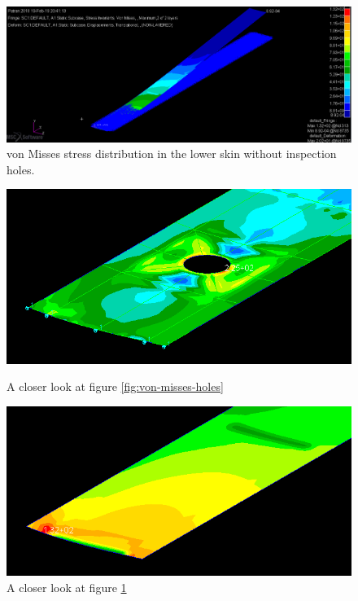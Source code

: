 \documentclass[11pt,a4paper,oneside]{memoir}
\begin{document}
\begin{enumerate}
    \begin{figure}[h]
        \centering
        \includegraphics[width = .8\textwidth]{figures/one-LWR-skin-von-misses.png}
        \caption{von Misses stress distribution in the lower skin without inspection holes.}
        \label{fig:von-misses-w/o-holes}
    \end{figure}
\begin{figure}[!hbt]
    \begin{minipage}{.5\textwidth}
    \centering
    \includegraphics[width = .92\textwidth]{figures/three.png}
    \caption{A closer look at figure \ref{fig:von-misses-holes}}
    \label{fig:von-misses-holes-zoom}
    \end{minipage}%
    \begin{minipage}{.5\textwidth}
    \centering
    \includegraphics[width = .95\textwidth]{figures/one.png}
    \caption{A closer look at figure \ref{fig:von-misses-w/o-holes}}

\end{minipage}
\end{figure}
\end{enumerate}
\end{document}
